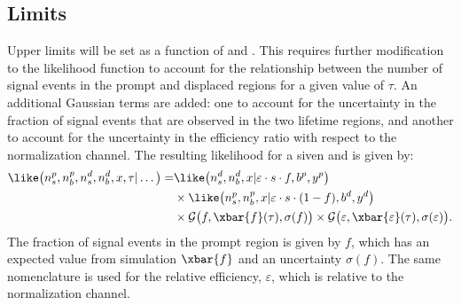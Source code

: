 \subsection{Limits}
Upper limits will be set as a function of \mass{\db} and \lifetime{\db}.
This requires further modification to the likelihood function to account for the relationship
between the number of signal events in the prompt and displaced regions for a given value of
$\tau$.
An additional Gaussian terms are added: one to account for the uncertainty in the fraction of signal
events that are observed in the two lifetime regions, and another to account for the uncertainty in
the efficiency ratio with respect to the normalization channel.
The resulting likelihood for a siven \mass{\db} and \lifetime{\db} is given by:
\begin{align}
  \like\big(n_s^p, n_b^p, n_s^d, n_b^d, x, \tau | \dots\big) =
   &\like\big(n_s^d, n_b^d, x | \varepsilon\cdot s\cdot f,b^p,y^p\big) \\\nonumber
   &\times\like\big(n_s^p, n_b^p, x | \varepsilon\cdot s\cdot(1-f),b^d,y^d\big)\\\nonumber
   &\times\mathcal{G}\big(f, \xbar{f}(\tau),\sigma(f)\big)
   \times\mathcal{G}\big(\varepsilon, \xbar{\varepsilon}(\tau),\sigma(\varepsilon)\big).
\end{align}
The fraction of signal events in the prompt region is given by $f$,
which has an expected value from simulation $\xbar{f}$ and an uncertainty $\sigma(f)$.
The same nomenclature is used for the relative efficiency, $\varepsilon$, which is relative to the
normalization channel.










